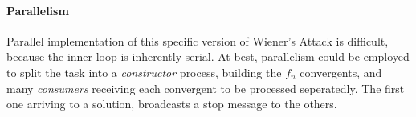 \paragraph{Parallelism}
Parallel implementation of this specific version of Wiener's Attack is
difficult, because the inner loop is inherently serial. At best, parallelism
could be employed to split the task into a \emph{constructor} process, building
the $f_n$ convergents, and many \emph{consumers} receiving each convergent to be
processed seperatedly.
The first one arriving to a solution, broadcasts a stop message to the others.

